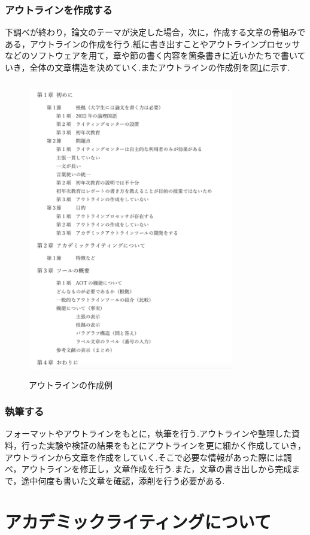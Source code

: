 \documentclass[a4j,12pt]{jarticle}
\begin{document}
\subsubsection{アウトラインを作成する}
下調べが終わり，論文のテーマが決定した場合，次に，作成する文章の骨組みである，アウトラインの作成を行う.紙に書き出すことやアウトラインプロセッサなどのソフトウェアを用て，章や節の書く内容を箇条書きに近いかたちで書いていき，全体の文章構造を決めていく.またアウトラインの作成例を図\ref{fig:a}に示す.
\begin{figure}[h]
\begin{center}
 \includegraphics[clip,width=90mm,height=130mm]{figure/outline2.png}
\end{center}
 \caption{アウトラインの作成例}
 \label{fig:a}
\end{figure}
\newpage
\subsubsection{執筆する}
フォーマットやアウトラインをもとに，執筆を行う.アウトラインや整理した資料，行った実験や検証の結果をもとにアウトラインを更に細かく作成していき，アウトラインから文章を作成をしていく.そこで必要な情報があった際には調べ，アウトラインを修正し，文章作成を行う.また，文章の書き出しから完成まで，途中何度も書いた文章を確認，添削を行う必要がある.
\newpage
\section{アカデミックライティングについて}
\end{document}
